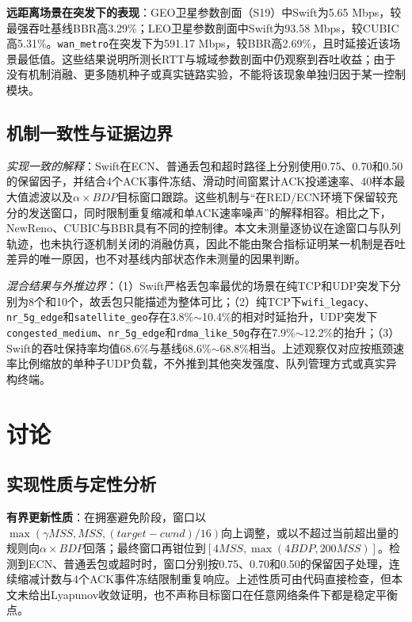 \documentclass[10pt,twocolumn]{article}
\begin{document}
\textbf{远距离场景在突发下的表现}：GEO卫星参数剖面（S19）中Swift为5.65 Mbps，较最强吞吐基线BBR高3.29\%；LEO卫星参数剖面中Swift为93.58 Mbps，较CUBIC高5.31\%。\texttt{wan\_metro}在突发下为591.17 Mbps，较BBR高2.69\%，且时延接近该场景最低值。这些结果说明所测长RTT与城域参数剖面中仍观察到吞吐收益；由于没有机制消融、更多随机种子或真实链路实验，不能将该现象单独归因于某一控制模块。

\subsection{机制一致性与证据边界}

\textit{实现一致的解释}：Swift在ECN、普通丢包和超时路径上分别使用0.75、0.70和0.50的保留因子，并结合4个ACK事件冻结、滑动时间窗累计ACK投递速率、40样本最大值滤波以及$\alpha\times BDP$目标窗口跟踪。这些机制与“在RED/ECN环境下保留较充分的发送窗口，同时限制重复缩减和单ACK速率噪声”的解释相容。相比之下，NewReno、CUBIC与BBR具有不同的控制律。本文未测量逐协议在途窗口与队列轨迹，也未执行逐机制关闭的消融仿真，因此不能由聚合指标证明某一机制是吞吐差异的唯一原因，也不对基线内部状态作未测量的因果判断。

\textit{混合结果与外推边界}：（1）Swift严格丢包率最优的场景在纯TCP和UDP突发下分别为8个和10个，故丢包只能描述为整体可比；（2）纯TCP下\texttt{wifi\_legacy}、\texttt{nr\_5g\_edge}和\texttt{satellite\_geo}存在3.8\%$\sim$10.4\%的相对时延抬升，UDP突发下\texttt{congested\_medium}、\texttt{nr\_5g\_edge}和\texttt{rdma\_like\_50g}存在7.9\%$\sim$12.2\%的抬升；（3）Swift的吞吐保持率均值68.6\%与基线68.6\%$\sim$68.8\%相当。上述观察仅对应按瓶颈速率比例缩放的单种子UDP负载，不外推到其他突发强度、队列管理方式或真实异构终端。

\section{讨论}
\label{sec:discussion}

\subsection{实现性质与定性分析}

\textbf{有界更新性质}：在拥塞避免阶段，窗口以$\max(\gamma MSS,MSS,(target-cwnd)/16)$向上调整，或以不超过当前超出量的规则向$\alpha\times BDP$回落；最终窗口再钳位到$[4MSS,\max(4BDP,200MSS)]$。检测到ECN、普通丢包或超时时，窗口分别按0.75、0.70和0.50的保留因子处理，连续缩减计数与4个ACK事件冻结限制重复响应。上述性质可由代码直接检查，但本文未给出Lyapunov收敛证明，也不声称目标窗口在任意网络条件下都是稳定平衡点。
\end{document}
